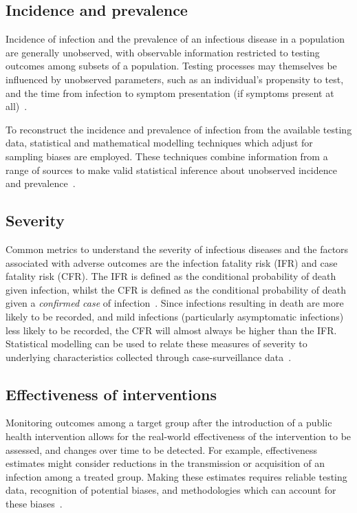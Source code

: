 \subsection{Incidence and prevalence}

Incidence of infection and the prevalence of an infectious disease in a population are generally unobserved, with observable information restricted to testing outcomes among subsets of a population. Testing processes may themselves be influenced by unobserved parameters, such as an individual's propensity to test, and the time from infection to symptom presentation (if symptoms present at all)~\parencite{Lewis2017-lt}.

To reconstruct the incidence and prevalence of infection from the available testing data, statistical and mathematical modelling techniques which adjust for sampling biases are employed. These techniques combine information from a range of sources to make valid statistical inference about unobserved incidence and prevalence~\parencite{Karon2008-pd, Hallett2008-et}.

\subsection{Severity}

Common metrics to understand the severity of infectious diseases and the factors associated with adverse outcomes are the infection fatality risk (IFR) and case fatality risk (CFR). The IFR is defined as the conditional probability of death given infection, whilst the CFR is defined as the conditional probability of death given a \textit{confirmed case} of infection~\parencite{Perez-Guzman2023-ih}. Since infections resulting in death are more likely to be recorded, and mild infections (particularly asymptomatic infections) less likely to be recorded, the CFR will almost always be higher than the IFR\@. Statistical modelling can be used to relate these measures of severity to underlying characteristics collected through case-surveillance data~\parencite{Wong2013-aq}.

\subsection{Effectiveness of interventions}

Monitoring outcomes among a target group after the introduction of a public health intervention allows for the real-world effectiveness of the intervention to be assessed, and changes over time to be detected. For example, effectiveness estimates might consider reductions in the transmission or acquisition of an infection among a treated group. Making these estimates requires reliable testing data, recognition of potential biases, and methodologies which can account for these biases~\parencite{Brauner2021-np}.

